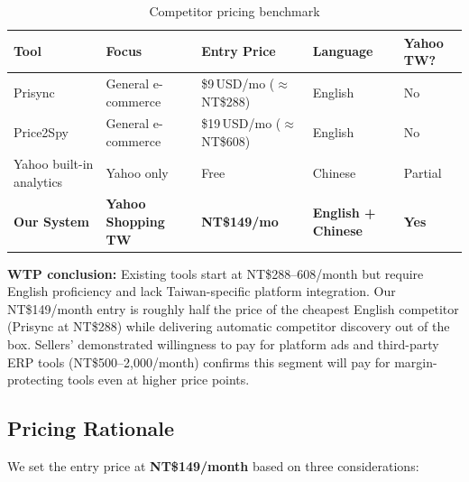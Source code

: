 \documentclass[11pt,a4paper]{article}
\begin{document}
\begin{table}[H]
\centering\small\renewcommand{\arraystretch}{1.25}
\begin{tabularx}{\textwidth}{L{2.6cm} L{3cm} C{2.4cm} C{2cm} C{2cm}}
\toprule
\textbf{Tool} & \textbf{Focus} & \textbf{Entry Price} & \textbf{Language} & \textbf{Yahoo TW?} \\
\midrule
Prisync   & General e-commerce & \$9\,USD/mo ($\approx$NT\$288)  & English & No \\
Price2Spy & General e-commerce & \$19\,USD/mo ($\approx$NT\$608) & English & No \\
Yahoo built-in analytics & Yahoo only & Free & Chinese & Partial \\
\textbf{Our System} & \textbf{Yahoo Shopping TW} & \textbf{NT\$149/mo} & \textbf{English + Chinese} & \textbf{Yes} \\
\bottomrule
\end{tabularx}
\caption{Competitor pricing benchmark}
\end{table}

\begin{successbox}
\textbf{WTP conclusion:} Existing tools start at NT\$288--608/month but require
English proficiency and lack Taiwan-specific platform integration. Our NT\$149/month
entry is roughly half the price of the cheapest English competitor (Prisync at
NT\$288) while delivering automatic competitor discovery out of the box.
Sellers' demonstrated willingness to pay for platform ads and third-party ERP
tools (NT\$500--2,000/month) confirms this segment will pay for margin-protecting
tools even at higher price points.
\end{successbox}

\subsection{Pricing Rationale}

We set the entry price at \textbf{NT\$149/month} based on three considerations:
\end{document}
